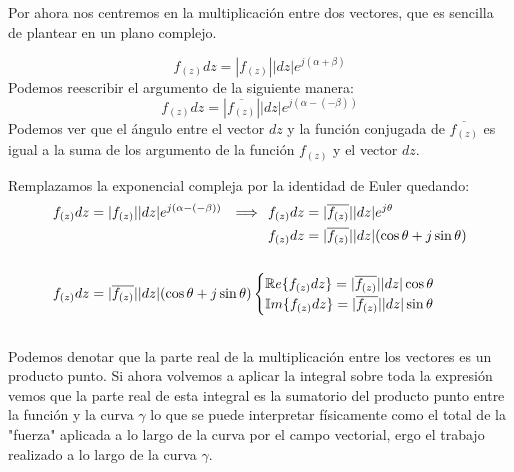 Por ahora nos centremos en la multiplicación entre dos vectores, que es sencilla de plantear en un plano complejo.
\begin{figure}[H]
    \centering
    
    \label{fig:enter-label}
\end{figure}
\begin{equation}
    f_{(z)} dz= |f_{(z)}||dz|e^{j(\alpha+\beta)}
\end{equation}
Podemos reescribir el argumento de la siguiente manera:
\begin{equation}
    f_{(z)} dz= |\overline{f_{(z)}}||dz|e^{j(\alpha-(-\beta))}
\end{equation}
Podemos ver que el ángulo entre el vector $dz$ y la función conjugada de $\overline{f_{(z)}}$ es igual a la suma de los argumento de la función $f_{(z)}$ y el vector $dz$.
\begin{figure}[H]
    \centering
    
    \label{fig:enter-label}
\end{figure}
Remplazamos la exponencial compleja por la  identidad de Euler quedando:
\begin{equation}
\begin{aligned}
&\begin{aligned}
      f_{(z)} dz= |f_{(z)}||dz|e^{j(\alpha-(-\beta))} \hspace{0.25cm} \Longrightarrow \hspace{0.25cm} & f_{(z)} dz= |\overline{f_{(z)}}||dz|e^{j\theta} \\
                                                    & f_{(z)} dz=|\overline{f_{(z)}}||dz|(\cos{\theta}+j\sin{\theta})\\
\end{aligned}\\
&\\
 &f_{(z)} dz=|\overline{f_{(z)}}||dz|(\cos{\theta}+j\sin{\theta})
\begin{cases}
    \mathbb{R}{e}\{f_{(z)} dz\}=|\overline{f_{(z)}}||dz|\cos{\theta}\\
    \mathbb{I}{m}\{f_{(z)} dz\}=|\overline{f_{(z)}}||dz| \sin{\theta}  
\end{cases}\\
&\\
\end{aligned}
\end{equation}
Podemos denotar que la parte real de la multiplicación entre los vectores es un producto punto. Si ahora volvemos a aplicar la integral sobre toda la expresión vemos que la parte real de esta integral es la sumatorio del producto punto entre la función y la curva $\gamma$ lo que se puede interpretar físicamente como el total de la "fuerza" aplicada a lo largo de la curva por el campo vectorial, ergo el trabajo realizado a lo largo de la curva $\gamma$.
